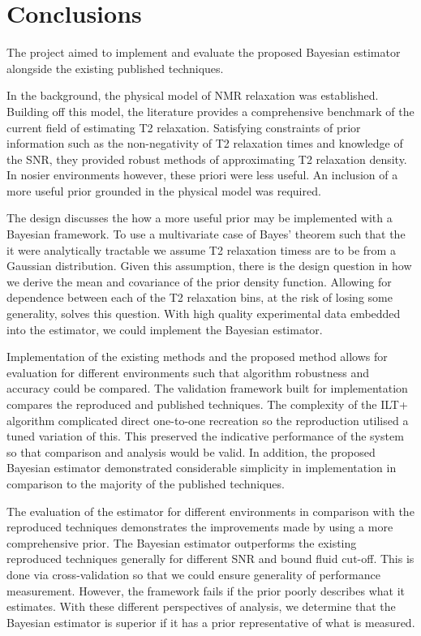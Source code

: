 \chapter{Conclusions}\label{C:conclusions}

The project aimed to implement and evaluate the proposed Bayesian estimator alongside the existing published techniques.

In the background, the physical model of NMR relaxation was established. Building off this model, the literature provides a comprehensive benchmark of the current field of estimating T2 relaxation. Satisfying constraints of prior information such as the non-negativity of T2 relaxation times and knowledge of the SNR, they provided robust methods of approximating T2 relaxation density. In nosier environments however, these priori were less useful. An inclusion of a more useful prior grounded in the physical model was required.

The design discusses the how a more useful prior may be implemented with a Bayesian framework. To use a multivariate case of Bayes' theorem such that the it were analytically tractable we assume T2 relaxation timess are to be from a Gaussian distribution. Given this assumption, there is the design question in how we derive the mean and covariance of the prior density function. Allowing for dependence between each of the T2 relaxation bins, at the risk of losing some generality, solves this question. With high quality experimental data embedded into the estimator, we could implement the Bayesian estimator.

Implementation of the existing methods and the proposed method allows for evaluation for different environments such that algorithm robustness and accuracy could be compared. The validation framework built for implementation compares the reproduced and published techniques. The complexity of the ILT+ algorithm complicated direct one-to-one recreation so the reproduction utilised a tuned variation of this. This preserved the indicative performance of the system so that comparison and analysis would be valid. In addition, the proposed Bayesian estimator demonstrated considerable simplicity in implementation in comparison to the majority of the published techniques.

The evaluation of the estimator for different environments in comparison with the reproduced techniques demonstrates the improvements made by using a more comprehensive prior. The Bayesian estimator outperforms the existing reproduced techniques generally for different SNR and bound fluid cut-off. This is done via cross-validation so that we could ensure generality of performance measurement. However, the framework fails if the prior poorly describes what it estimates. With these different perspectives of analysis, we determine that the Bayesian estimator is superior if it has a prior representative of what is measured.


